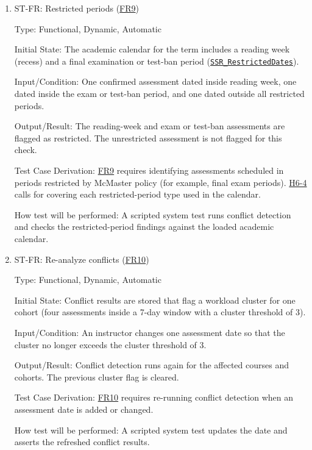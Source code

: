 \documentclass[12pt, titlepage]{article}
\newcounter{stnum}
\newcommand{\halink}[1]{\href{https://github.com/shivyam/cas-course-optimization/blob/main/pdfs/HazardAnalysis/HazardAnalysis.pdf}{#1}}
\newcommand{\frlink}[1]{\href{https://github.com/shivyam/cas-course-optimization/blob/main/pdfs/SRS-IEEE/SRS.pdf}{FR#1}}
\begin{document}
\begin{enumerate}
How test will be performed: A scripted system test loads the fixture data and asserts which windows are flagged.


\item{ST-FR\thestnum \label{ST_Work_Policy}: Restricted periods (\frlink{9})\\}

Type: Functional, Dynamic, Automatic

Initial State: The academic calendar for the term includes a reading week (recess) and a final examination or test-ban period (\halink{\texttt{SSR\_RestrictedDates}}).

Input/Condition: One confirmed assessment dated inside reading week, one dated inside the exam or test-ban period, and one dated outside all restricted periods.

Output/Result: The reading-week and exam or test-ban assessments are flagged as restricted. The unrestricted assessment is not flagged for this check.

Test Case Derivation: \frlink{9} requires identifying assessments scheduled in periods restricted by McMaster policy (for example, final exam periods). \halink{H6-4} calls for covering each restricted-period type used in the calendar.

How test will be performed: A scripted system test runs conflict detection and checks the restricted-period findings against the loaded academic calendar.


\item{ST-FR\thestnum \label{ST_Reanalyze}: Re-analyze conflicts (\frlink{10})\\}

Type: Functional, Dynamic, Automatic

Initial State: Conflict results are stored that flag a workload cluster for one cohort (four assessments inside a 7-day window with a cluster threshold of 3).

Input/Condition: An instructor changes one assessment date so that the cluster no longer exceeds the cluster threshold of 3.

Output/Result: Conflict detection runs again for the affected courses and cohorts. The previous cluster flag is cleared.

Test Case Derivation: \frlink{10} requires re-running conflict detection when an assessment date is added or changed.

How test will be performed: A scripted system test updates the date and asserts the refreshed conflict results.

\end{enumerate}
\end{document}

